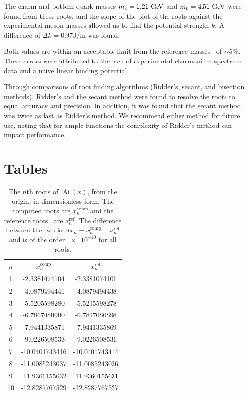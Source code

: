 \documentclass[]{article}
\newcommand{\Ai}[1]{\ensuremath{\operatorname{Ai}({#1})}}
\begin{document}
The charm and bottom quark masses $m_{c} = 1.21\GeV$ and $m_{b} = 4.51\GeV$ were found from these roots, and the slope of the plot of the roots against the experimental meson masses allowed us to find the potential strength $k$. A difference of $\Delta k = 0.97 \si{\joule\per\metre}$ was found.

Both values are within an acceptable limit from the reference masses~\cite{ref:pdg} of $\sim 5\%$. These errors were attributed to the lack of experimental charmonium spectrum data and a naive linear binding potential. 

Through comparisons of root finding algorithms (Ridder's, secant, and bisection methods), Ridder's and the secant method were found to resolve the roots to equal accuracy and precision. In addition, it was found that the secant method was twice as fast as Ridder's method. We recommend either method for future use, noting that for simple functions the complexity of Ridder's method can impact performance.



\section{Tables}

\begin{table}[H]
	\begin{center}
		\begin{tabular}{ c c c }
			$n$ & $x_{n}^{\mathrm{comp}}$ & $x_{n}^{\mathrm{ref}}$\\
			\hline
			1  & -2.3381074104  & -2.3381074101 \\
			2  & -4.0879494441  & -4.0879494438 \\
			3  & -5.5205598280  & -5.5205598278 \\
			4  & -6.7867080900  & -6.7867080898 \\
			5  & -7.9441335871  & -7.9441335869 \\
			6  & -9.0226508533  & -9.0226508531 \\
			7  & -10.0401743416 & -10.0401743414\\
			8  & -11.0085243037 & -11.0085243036\\
			9  & -11.9360155632 & -11.9360155631\\
			10 & -12.8287767529 & -12.8287767527
		\end{tabular}
		\caption{The $n$th roots of \Ai{x}, from the origin, in dimensionless form. The computed roots are $x_{n}^{\mathrm{comp}}$ and the reference roots~\cite{ref:abramowitz} are $x_{n}^{\mathrm{ref}}$. The difference between the two is $\Delta x_{n} = x_{n}^{\mathrm{comp}} - x_{n}^{\mathrm{ref}}$ and is of the order $\num{e-10}$ for all roots.}
		\label{tab:roots}
	\end{center}
\end{table}
\end{document}
